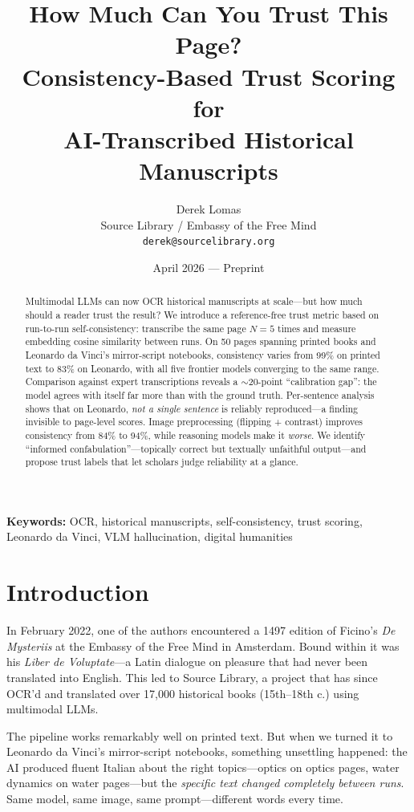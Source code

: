 \documentclass[10pt,twocolumn]{article}
\title{\Large\bfseries How Much Can You Trust This Page?\\[4pt] Consistency-Based Trust Scoring for\\AI-Transcribed Historical Manuscripts}
\author{Derek Lomas\\
\small Source Library / Embassy of the Free Mind\\
\small \texttt{derek@sourcelibrary.org}}
\date{April 2026 --- Preprint}
\newcommand{\keywords}[1]{\par\smallskip\noindent\textbf{Keywords:} #1}
\begin{document}
\maketitle
\thispagestyle{empty}

\begin{abstract}
\noindent Multimodal LLMs can now OCR historical manuscripts at scale---but how much should a reader trust the result? We introduce a reference-free trust metric based on run-to-run self-consistency: transcribe the same page $N{=}5$ times and measure embedding cosine similarity between runs. On 50 pages spanning printed books and Leonardo da Vinci's mirror-script notebooks, consistency varies from 99\% on printed text to 83\% on Leonardo, with all five frontier models converging to the same range. Comparison against expert transcriptions reveals a ${\sim}$20-point ``calibration gap'': the model agrees with itself far more than with the ground truth. Per-sentence analysis shows that on Leonardo, \emph{not a single sentence} is reliably reproduced---a finding invisible to page-level scores. Image preprocessing (flipping + contrast) improves consistency from 84\% to 94\%, while reasoning models make it \emph{worse}. We identify ``informed confabulation''---topically correct but textually unfaithful output---and propose trust labels that let scholars judge reliability at a glance.
\end{abstract}

\keywords{OCR, historical manuscripts, self-consistency, trust scoring, Leonardo da Vinci, VLM hallucination, digital humanities}

\section{Introduction}

In February 2022, one of the authors encountered a 1497 edition of Ficino's \emph{De Mysteriis} at the Embassy of the Free Mind in Amsterdam. Bound within it was his \emph{Liber de Voluptate}---a Latin dialogue on pleasure that had never been translated into English. This led to Source Library, a project that has since OCR'd and translated over 17,000 historical books (15th--18th c.) using multimodal LLMs.

The pipeline works remarkably well on printed text. But when we turned it to Leonardo da Vinci's mirror-script notebooks, something unsettling happened: the AI produced fluent Italian about the right topics---optics on optics pages, water dynamics on water pages---but the \emph{specific text changed completely between runs}. Same model, same image, same prompt---different words every time.
\end{document}
